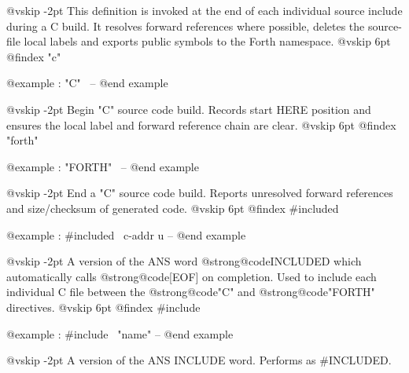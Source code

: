 @vskip -2pt
This definition is invoked at the end of each individual source
include during a C build. It resolves forward references where
possible, deletes the source-file local labels and exports public
symbols to the Forth namespace.
@vskip 6pt
@findex "c"

@example
: "C"                   \ -- @end example

@vskip -2pt
Begin "C" source code build. Records start HERE position and ensures
the local label and forward reference chain are clear.
@vskip 6pt
@findex "forth"

@example
: "FORTH"               \ -- @end example

@vskip -2pt
End a "C" source code build. Reports unresolved forward references
and size/checksum of generated code.
@vskip 6pt
@findex #included

@example
: #included             \ c-addr u -- @end example

@vskip -2pt
A version of the ANS word @strong{@code{INCLUDED}} which automatically
calls @strong{@code{[EOF]}} on completion. Used to include each
individual C file between the @strong{@code{"C"}} and @strong{@code{"FORTH"}}
directives.
@vskip 6pt
@findex #include

@example
: #include              \ "name" -- @end example

@vskip -2pt
A version of the ANS INCLUDE word. Performs as #INCLUDED.
